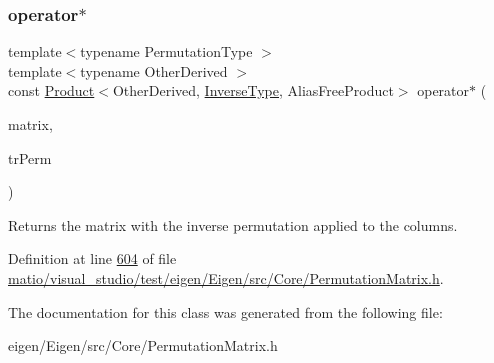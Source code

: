 \subsubsection{\texorpdfstring{operator$\ast$}{operator*}\hspace{0.1cm}{\footnotesize\ttfamily [2/2]}}
{\footnotesize\ttfamily template$<$typename Permutation\+Type $>$ \\
template$<$typename Other\+Derived $>$ \\
const \hyperlink{group___core___module_class_eigen_1_1_product}{Product}$<$Other\+Derived, \hyperlink{class_eigen_1_1_inverse}{Inverse\+Type}, Alias\+Free\+Product$>$ operator$\ast$ (\begin{DoxyParamCaption}\item[{const \hyperlink{group___core___module_class_eigen_1_1_matrix_base}{Matrix\+Base}$<$ Other\+Derived $>$ \&}]{matrix,  }\item[{const \hyperlink{class_eigen_1_1_inverse}{Inverse\+Type} \&}]{tr\+Perm }\end{DoxyParamCaption})\hspace{0.3cm}{\ttfamily [friend]}}

\begin{DoxyReturn}{Returns}
the matrix with the inverse permutation applied to the columns. 
\end{DoxyReturn}


Definition at line \hyperlink{matio_2visual__studio_2test_2eigen_2_eigen_2src_2_core_2_permutation_matrix_8h_source_l00604}{604} of file \hyperlink{matio_2visual__studio_2test_2eigen_2_eigen_2src_2_core_2_permutation_matrix_8h_source}{matio/visual\+\_\+studio/test/eigen/\+Eigen/src/\+Core/\+Permutation\+Matrix.\+h}.



The documentation for this class was generated from the following file\+:\begin{DoxyCompactItemize}
\item 
eigen/\+Eigen/src/\+Core/\+Permutation\+Matrix.\+h\end{DoxyCompactItemize}
